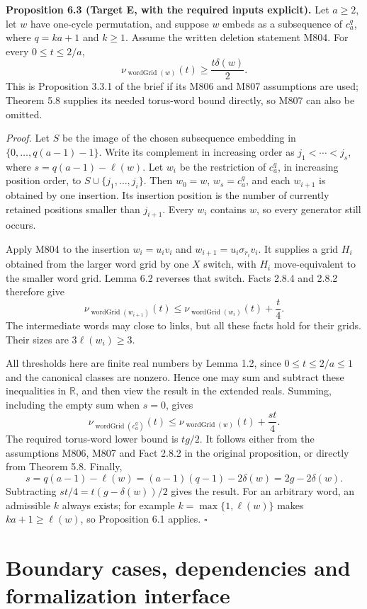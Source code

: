\documentclass[11pt,a4paper]{article}
\begin{document}
\textbf{Proposition 6.3 (Target E, with the required inputs explicit).}
Let $a\ge2$, let $w$ have one-cycle permutation, and suppose
$w$ embeds as a subsequence of $c_a^q$, where $q=ka+1$ and
$k\ge1$. Assume the written deletion statement M804.
For every $0\le t\le2/a$,
\[
\nu_{\operatorname{wordGrid}(w)}(t)
\ge\frac{t\delta(w)}{2}.
\]
This is Proposition 3.3.1 of the brief if its M806 and M807
assumptions are used; Theorem 5.8 supplies its needed torus-word
bound directly, so M807 can also be omitted.

\textit{Proof.}
Let $S$ be the image of the chosen subsequence embedding in
$\{0,\ldots,q(a-1)-1\}$. Write its complement in increasing
order as $j_1<\cdots<j_s$, where $s=q(a-1)-\ell(w)$.
Let $w_i$ be the restriction of $c_a^q$, in increasing
position order, to $S\cup\{j_1,\ldots,j_i\}$. Then
$w_0=w$, $w_s=c_a^q$, and each $w_{i+1}$ is obtained by
one insertion. Its insertion position is the number of
currently retained positions smaller than $j_{i+1}$.
Every $w_i$ contains $w$, so every generator still occurs.

Apply M804 to the insertion $w_i=u_iv_i$ and
$w_{i+1}=u_i\sigma_{r_i}v_i$. It supplies a grid $H_i$
obtained from the larger word grid by one $X$ switch,
with $H_i$ move-equivalent to the smaller word grid.
Lemma 6.2 reverses that switch. Facts 2.8.4 and 2.8.2
therefore give
\[
\nu_{\operatorname{wordGrid}(w_{i+1})}(t)
\le\nu_{\operatorname{wordGrid}(w_i)}(t)+\frac{t}{4}.
\]
The intermediate words may close to links, but all these
facts hold for their grids. Their sizes are $3\ell(w_i)\ge3$.

All thresholds here are finite real numbers by Lemma 1.2,
since $0\le t\le2/a\le1$ and the canonical classes are
nonzero. Hence one may sum and subtract these inequalities
in $\mathbb R$, and then view the result in the extended
reals. Summing, including the empty sum when $s=0$, gives
\[
\nu_{\operatorname{wordGrid}(c_a^q)}(t)
\le\nu_{\operatorname{wordGrid}(w)}(t)+\frac{st}{4}.
\]
The required torus-word lower bound is $tg/2$. It follows
either from the assumptions M806, M807 and Fact 2.8.2 in
the original proposition, or directly from Theorem 5.8.
Finally,
\[
s=q(a-1)-\ell(w)
=(a-1)(q-1)-2\delta(w)=2g-2\delta(w).
\]
Subtracting $st/4=t(g-\delta(w))/2$ gives the result.
For an arbitrary word, an admissible $k$ always exists;
for example $k=\max\{1,\ell(w)\}$ makes $ka+1\ge\ell(w)$,
so Proposition 6.1 applies. $\square$

\section{Boundary cases, dependencies and formalization interface}
\end{document}
